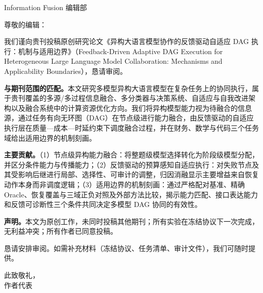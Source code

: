 \documentclass[12pt]{letter}
\begin{document}
\begin{letter}{Information Fusion 编辑部}

\opening{尊敬的编辑：}

我们谨向贵刊投稿原创研究论文《异构大语言模型协作的反馈驱动自适应 DAG 执行：机制与适用边界》（Feedback-Driven Adaptive DAG Execution for Heterogeneous Large Language Model Collaboration: Mechanisms and Applicability Boundaries），恳请审阅。

\textbf{与期刊范围的匹配。}本文研究多模型异构大语言模型在复杂任务上的协同执行，属于贵刊覆盖的多源/多过程信息融合、多分类器与决策系统、自适应与自我改进架构以及融合系统中的计算资源优化方向。我们将异构模型能力视为待融合的信息源，通过任务有向无环图（DAG）在节点级进行能力融合，由反馈驱动的自适应执行层在质量—成本—时延约束下调度融合过程，并在财务、数学与代码三个任务域给出适用边界的机制刻画。

\textbf{主要贡献。}（1）节点级异构能力融合：将整题级模型选择转化为阶段级模型分配，并区分条件能力与传播能力；（2）反馈驱动的预算感知自适应执行：对失败节点及其受影响后继进行局部、选择性、可审计的调整，归因消融显示主要增益来自恢复动作本身而非调度逻辑；（3）适用边界的机制刻画：通过严格配对基准、精确 Oracle、恢复覆盖与三域正负对照及外部方法比较，揭示能力匹配、接口表达能力和反馈可诊断性三个条件共同决定多模型 DAG 协同的有效性。

\textbf{声明。}本文为原创工作，未同时投稿其他期刊；所有实验在冻结协议下一次完成，无利益冲突；所有作者已同意投稿。

恳请安排审阅。如需补充材料（冻结协议、任务清单、审计文件），我们可随时提供。

\closing{此致敬礼，\\ 作者代表}

\end{letter}
\end{document}
